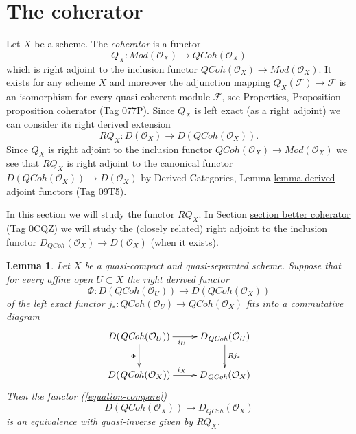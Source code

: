 \documentclass{amsart}
\theoremstyle{plain}
\newtheorem{lemma}[subsection]{Lemma}
\theoremstyle{definition}
\theoremstyle{remark}
\numberwithin{equation}{subsection}
\def\QCoh{\mathit{QCoh}}
\begin{document}
\section{The coherator}
\label{section-coherator}

\noindent
Let $X$ be a scheme. The {\it coherator} is a functor
$$
Q_X :
\textit{Mod}(\mathcal{O}_X)
\longrightarrow
\QCoh(\mathcal{O}_X)
$$
which is right adjoint to the inclusion functor
$\QCoh(\mathcal{O}_X) \to \textit{Mod}(\mathcal{O}_X)$.
It exists for any scheme $X$ and moreover the adjunction mapping
$Q_X(\mathcal{F}) \to \mathcal{F}$ is an isomorphism for every
quasi-coherent module $\mathcal{F}$, see
Properties, Proposition \href{https://stacks.math.columbia.edu/tag/077P}{proposition coherator (Tag 077P)}.
Since $Q_X$ is left exact (as a right adjoint) we can consider its
right derived extension
$$
RQ_X :
D(\mathcal{O}_X)
\longrightarrow
D(\QCoh(\mathcal{O}_X)).
$$
Since $Q_X$ is right adjoint to the inclusion functor
$\QCoh(\mathcal{O}_X) \to \textit{Mod}(\mathcal{O}_X)$
we see that $RQ_X$ is right adjoint to the canonical functor
$D(\QCoh(\mathcal{O}_X)) \to D(\mathcal{O}_X)$ by
Derived Categories, Lemma \href{https://stacks.math.columbia.edu/tag/09T5}{lemma derived adjoint functors (Tag 09T5)}.

\medskip\noindent
In this section we will study the functor $RQ_X$. In
Section \href{https://stacks.math.columbia.edu/tag/0CQZ}{section better coherator (Tag 0CQZ)}
we will study the (closely related) right adjoint to the inclusion functor
$D_\QCoh(\mathcal{O}_X) \to D(\mathcal{O}_X)$ (when it exists).



\begin{lemma}
\label{lemma-argument-proves}
Let $X$ be a quasi-compact and quasi-separated scheme. Suppose that
for every affine open $U \subset X$ the right derived functor
$$
\Phi : D(\QCoh(\mathcal{O}_U)) \to D(\QCoh(\mathcal{O}_X))
$$
of the left exact functor
$j_* : \QCoh(\mathcal{O}_U) \to \QCoh(\mathcal{O}_X)$
fits into a commutative diagram
$$
\xymatrix{
D(\QCoh(\mathcal{O}_U)) \ar[d]_\Phi \ar[r]_{i_U} &
D_\QCoh(\mathcal{O}_U) \ar[d]^{Rj_*} \\
D(\QCoh(\mathcal{O}_X)) \ar[r]^{i_X} &
D_\QCoh(\mathcal{O}_X)
}
$$
Then the functor (\ref{equation-compare})
$$
D(\QCoh(\mathcal{O}_X))
\longrightarrow
D_\QCoh(\mathcal{O}_X)
$$
is an equivalence with quasi-inverse given by $RQ_X$.
\end{lemma}
\end{document}
